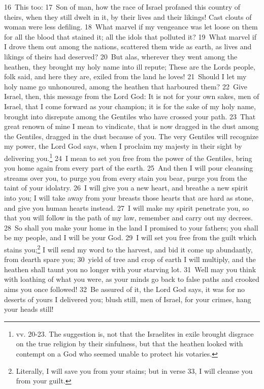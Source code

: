 \documentclass[10pt]{book} %
\begin{document}
\textcolor{benred8}{16}~This too: \textcolor{benred8}{17}~Son of man, how the race of Israel profaned this country of theirs, when they still dwelt in it, by their lives and their likings! Cast clouts of woman were less defiling. \textcolor{benred8}{18}~What marvel if my vengeance was let loose on them for all the blood that stained it; all the idols that polluted it? \textcolor{benred8}{19}~What marvel if I drove them out among the nations, scattered them wide as earth, as lives and likings of theirs had deserved? \textcolor{benred8}{20}~But alas, wherever they went among the heathen, they brought my holy name into ill repute; These are the Lord\textquotesingle s people, folk said, and here they are, exiled from the land he loves! \textcolor{benred8}{21}~Should I let my holy name go unhonoured, among the heathen that harboured them?
\textcolor{benred8}{22}~Give Israel, then, this message from the Lord God: It is not for your own sakes, men of Israel, that I come forward as your champion; it is for the sake of my holy name, brought into disrepute among the Gentiles who have crossed your path. \textcolor{benred8}{23}~That great renown of mine I mean to vindicate, that is now dragged in the dust among the Gentiles, dragged in the dust because of you. The very Gentiles will recognize my power, the Lord God says, when I proclaim my majesty in their sight by delivering you.\footnote[2]{vv. 20-23. The suggestion is, not that the Israelites in exile brought disgrace on the true religion by their sinfulness, but that the heathen looked with contempt on a God who seemed unable to protect his votaries.} \textcolor{benred8}{24}~I mean to set you free from the power of the Gentiles, bring you home again from every part of the earth. \textcolor{benred8}{25}~And then I will pour cleansing streams over you, to purge you from every stain you bear, purge you from the taint of your idolatry. \textcolor{benred8}{26}~I will give you a new heart, and breathe a new spirit into you; I will take away from your breasts those hearts that are hard as stone, and give you human hearts instead. \textcolor{benred8}{27}~I will make my spirit penetrate you, so that you will follow in the path of my law, remember and carry out my decrees. \textcolor{benred8}{28}~So shall you make your home in the land I promised to your fathers; you shall be my people, and I will be your God. \textcolor{benred8}{29}~I will set you free from the guilt which stains you;\footnote[3]{Literally, \textasciigrave I will save you from your stains\textquotesingle ; but in verse 33, \textasciigrave I will cleanse you from your guilt\textquotesingle .} I will send my word to the harvest, and bid it come up abundantly, from dearth spare you; \textcolor{benred8}{30}~yield of tree and crop of earth I will multiply, and the heathen shall taunt you no longer with your starving lot. \textcolor{benred8}{31}~Well may you think with loathing of what you were, as your minds go back to false paths and crooked aims you once followed! \textcolor{benred8}{32}~Be assured of it, the Lord God says, it was for no deserts of yours I delivered you; blush still, men of Israel, for your crimes, hang your heads still!
\end{document}
